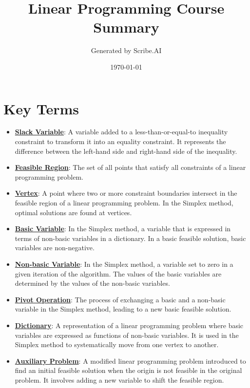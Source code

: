 \documentclass{article}%
\title{Linear Programming Course Summary}%
\author{Generated by Scribe.AI}%
\date{\today}%
\begin{document}
%
\normalsize%
\maketitle%
\section{Key Terms}%
\label{sec:KeyTerms}%
\begin{itemize}[leftmargin=*]%
\item \href{https://www.math.purdue.edu/~yipn/421/2024-08-27-ExSimplex.pdf#page=1}{\textbf{Slack Variable}}: A variable added to a less-than-or-equal-to inequality constraint to transform it into an equality constraint. It represents the difference between the left-hand side and right-hand side of the inequality.%
\item \href{https://www.math.purdue.edu/~yipn/421/2024-08-27-ExSimplex.pdf#page=4}{\textbf{Feasible Region}}: The set of all points that satisfy all constraints of a linear programming problem.%
\item \href{https://www.math.purdue.edu/~yipn/421/2024-08-27-ExSimplex.pdf#page=5}{\textbf{Vertex}}: A point where two or more constraint boundaries intersect in the feasible region of a linear programming problem. In the Simplex method, optimal solutions are found at vertices.%
\item \href{https://www.math.purdue.edu/~yipn/421/2024-08-27-ExSimplex.pdf#page=6}{\textbf{Basic Variable}}: In the Simplex method, a variable that is expressed in terms of non-basic variables in a dictionary. In a basic feasible solution, basic variables are non-negative.%
\item \href{https://www.math.purdue.edu/~yipn/421/2024-08-27-ExSimplex.pdf#page=6}{\textbf{Non{-}basic Variable}}: In the Simplex method, a variable set to zero in a given iteration of the algorithm. The values of the basic variables are determined by the values of the non-basic variables.%
\item \href{https://www.math.purdue.edu/~yipn/421/2024-08-27-ExSimplex.pdf#page=9}{\textbf{Pivot Operation}}: The process of exchanging a basic and a non-basic variable in the Simplex method, leading to a new basic feasible solution.%
\item \href{https://www.math.purdue.edu/~yipn/421/2024-08-27-ExSimplex.pdf#page=26}{\textbf{Dictionary}}: A representation of a linear programming problem where basic variables are expressed as functions of non-basic variables. It is used in the Simplex method to systematically move from one vertex to another.%
\item \href{https://www.math.purdue.edu/~yipn/421/2024-08-27-ExSimplex.pdf#page=32}{\textbf{Auxiliary Problem}}: A modified linear programming problem introduced to find an initial feasible solution when the origin is not feasible in the original problem. It involves adding a new variable to shift the feasible region.%
\end{itemize}%
\end{document}
